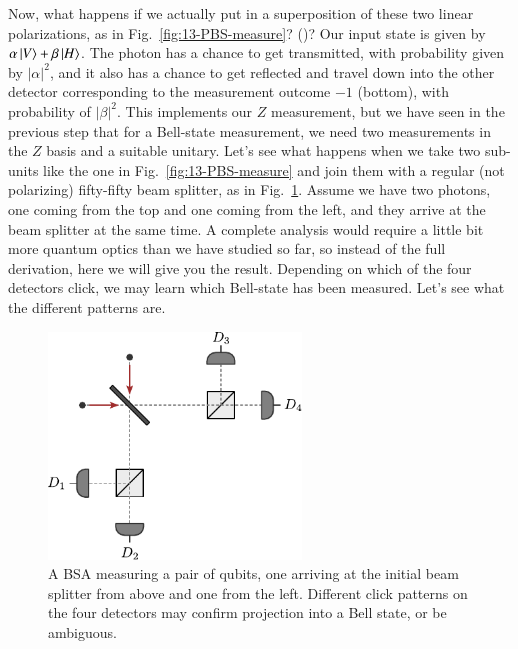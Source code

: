 Now, what happens if we actually put in a superposition of these two linear polarizations, as in Fig.~\ref{fig:13-PBS-measure}? ()? Our input state is given by $\alpha\left| V \right\rangle + \beta \left| H \right\rangle$. The photon has a chance to get transmitted, with probability given by $|\alpha|^2$, and it also has a chance to get reflected and travel down into the other detector corresponding to the measurement outcome $-1$ (bottom), with probability of $|\beta|^2$. This implements our $Z$ measurement, but we have seen in the previous step that for a Bell-state measurement, we need two measurements in the $Z$ basis and a suitable unitary. Let's see what happens when we take two sub-units like the one in Fig.~\ref{fig:13-PBS-measure} and join them with a regular (not polarizing) fifty-fifty beam splitter, as in Fig.~\ref{fig:13-BSA-clicks}. Assume we have two photons, one coming from the top and one coming from the left, and they arrive at the beam splitter at the same time.
A complete analysis would require a little bit more quantum optics than we have studied so far, so instead of the full derivation, here we will give you the result. Depending on which of the four detectors click, we may learn which Bell-state has been measured. Let's see what the different patterns are.

\begin{figure}[t]
    \centering
    \includegraphics[width=0.6\textwidth]{lesson13/13-3_BSA_clicks.pdf}
    \caption[A four-detector Bell-state analyzer (BSA)]{A BSA measuring a pair of qubits, one arriving at the initial beam splitter from above and one from the left.  Different click patterns on the four detectors may confirm projection into a Bell state, or be ambiguous.}
    \label{fig:13-BSA-clicks}
\end{figure}

